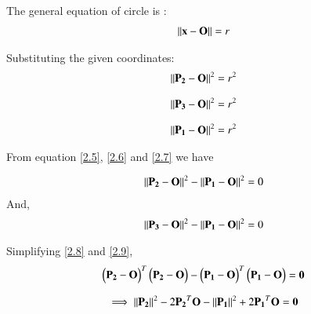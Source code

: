 \documentclass[journal,12pt,twocolumn]{IEEEtran}
\begin{document}
The general equation of circle is :
\begin{align}
\left\lVert\mathbf{x} - \mathbf{O}\right\rVert = r
\end{align}

Substituting the given coordinates:
\begin{align}
\left\lVert  \mathbf{P_2} - \mathbf{O}\right\rVert^{2} = r^{2} \label{2.5}
\end{align}

\begin{align}
\left\lVert  \mathbf{ P_3} - \mathbf{O}\right\rVert^{2} = r^{2} \label{2.6}
\end{align}


\begin{align}
\left\lVert  \mathbf{ P_1} - \mathbf{O}\right\rVert^{2} = r^{2} \label{2.7}
\end{align}

From equation \ref{2.5}, \ref{2.6} and \ref{2.7} we have 
%
%




\begin{align}
\left\lVert  \mathbf{ P_2} - \mathbf{O}\right\rVert^{2}  - \left\lVert \mathbf{P_1}  - \mathbf{O}\right\rVert^{2}   = 0 \label{2.8}
\end{align}
And,
\begin{align}
\left\lVert \mathbf{ P_3} - \mathbf{O}\right\rVert^{2}   - \left\lVert\mathbf{ P_1} - \mathbf{O}\right\rVert^{2}  = 0 \label{2.9}
\end{align}

 Simplifying   \ref{2.8} and \ref{2.9},
\begin{align}
\begin{pmatrix}\mathbf{P_2} - \mathbf{O}\end{pmatrix}^T \begin{pmatrix}\mathbf{P_2} - \mathbf{ O}\end{pmatrix} - \begin{pmatrix}\mathbf{P_1} - \mathbf{O}\end{pmatrix}^T\begin{pmatrix}\mathbf{P_1} - \mathbf{O}\end{pmatrix} = \mathbf{0} \label{2.10}
\end{align}



\begin{align}
\implies \left\lVert\mathbf{P_2}\right\rVert^2 - 2 \mathbf{P_2}^T\mathbf{O} - \left\lVert\mathbf{P_1}\right\rVert^2 +2\mathbf{P_1}^T \mathbf{O}  = \mathbf{0} \label{2.11}
\end{align}
\end{document}
